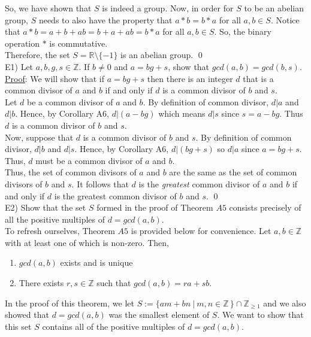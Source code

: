 \documentclass{article}
\begin{document}
\noindent
So, we have shown that $S$ is indeed a group.  Now, in order for $S$ to be an abelian group, $S$ needs to also have the property that $a * b  = b * a$ for all $a, b \in S$. Notice that $a * b = a + b + ab = b + a + ab = b * a$ for all $a, b \in S$. So, the binary operation $*$ is commutative. \\

\noindent
Therefore, the set $S = \mathbb{R} \setminus \{-1\}$ is an abelian group. \qed \\

\noindent E1) Let $a, b, g, s \in \mathbb{Z}$. If $b \neq 0$ and $a = bg + s$, show that $gcd(a, b) = gcd(b, s)$. \\

\noindent
\underline{Proof}: We will show that if $a = bg + s$ then there is an integer $d$ that is a common divisor of $a$ and $b$ if and only if $d$ is a common divisor of $b$ and $s$. \\

\noindent
Let $d$ be a common divisor of $a$ and $b$.  By definition of common divisor, $d \rvert a$ and $d \rvert b$. Hence, by Corollary A6, $d \rvert(a - bg)$ which means $d \rvert s$ since $s = a - bg$. Thus $d$ is a common divisor of $b$ and $s$. \\

\noindent
Now, suppose that $d$ is a common divisor of $b$ and $s$. By definition of common divisor, $d \rvert b$ and $d \rvert s$. Hence, by Corollary A6, $d \rvert (bg + s)$ so $d \rvert a$ since $a = bg + s$. Thus, $d$ must be a common divisor of $a$ and $b$. \\

\noindent
Thus, the set of common divisors of $a$ and $b$ are the same as the set of common divisors of $b$ and $s$. It follows that $d$ is the \textit{greatest} common divisor of $a$ and $b$ if and only if $d$ is the greatest common divisor of $b$ and $s$. \qed \\

\noindent E2) Show that the set $S$ formed in the proof of Theorem $A5$ consists precisely of all the positive multiples of $d = gcd(a, b)$. \\

\noindent
To refresh ourselves, Theorem $A5$ is provided below for convenience. Let $a, b \in \mathbb{Z}$ with at least one of which is non-zero. Then,
\begin{enumerate}
	\item $gcd(a, b)$ exists and is unique
	\item There exists $r, s \in \mathbb{Z}$ such that $gcd(a, b) = ra + sb$.
\end{enumerate}
In the proof of this theorem, we let $S := \{am + bn \ \rvert \ m, n \in \mathbb{Z} \,\} \cap \mathbb{Z}_{\geq 1}$ and we also showed that $d = gcd(a, b)$ was the smallest element of $S$. We want to show that this set $S$ contains all of the positive multiples of $d = gcd(a, b)$. \\
\end{document}
